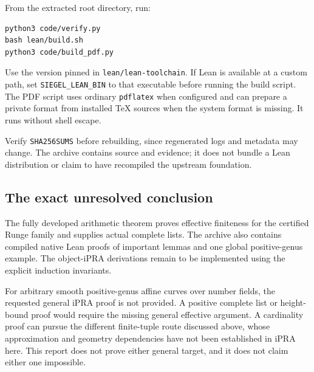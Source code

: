 From the extracted root directory, run:
\begin{lstlisting}
python3 code/verify.py
bash lean/build.sh
python3 code/build_pdf.py
\end{lstlisting}
Use the version pinned in \texttt{lean/lean-toolchain}. If Lean is
available at a custom path, set \texttt{SIEGEL\_LEAN\_BIN} to that
executable before running the build script. The PDF script uses
ordinary \texttt{pdflatex} when configured and can prepare a private
format from installed TeX sources when the system format is missing.
It runs without shell escape.

Verify \texttt{SHA256SUMS} before rebuilding, since regenerated
logs and metadata may change. The archive contains source and
evidence; it does not bundle a Lean distribution or claim to have
recompiled the upstream foundation.

\subsection{The exact unresolved conclusion}

The fully developed arithmetic theorem proves effective finiteness
for the certified Runge family and supplies actual complete lists.
The archive also contains compiled native Lean proofs of important
lemmas and one global positive-genus example. The object-iPRA
derivations remain to be implemented using the explicit induction
invariants.

For arbitrary smooth positive-genus affine curves over number fields,
the requested general iPRA proof is not provided. A positive complete
list or height-bound proof would require the missing general effective
argument. A cardinality proof can pursue the different finite-tuple
route discussed above, whose approximation and geometry dependencies
have not been established in iPRA here. This report does not prove
either general target, and it does not claim either one impossible.

